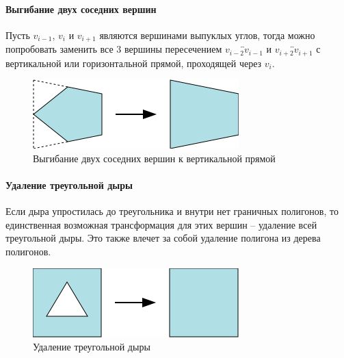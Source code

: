 \documentclass{fefu_thesis/cls/fefu}
\newcommand*\gline[1]{\overleftrightarrow{#1}}
\begin{document}
    \paragraph{Выгибание двух соседних вершин}
    Пусть $v_{i - 1}$, $v_{i}$ и $v_{i + 1}$ являются вершинами выпуклых углов, тогда можно попробовать заменить все 3 вершины пересечением $\gline{v_{i - 2}v_{i - 1}}$ и $\gline{v_{i + 2}v_{i + 1}}$ с вертикальной или горизонтальной прямой, проходящей через $v_i$.
    \begin{figure}[H]
        \centering
        \includegraphics[scale=1]{images/bendoutboth.png}
        \caption{Выгибание двух соседних вершин к вертикальной прямой}
    \end{figure}
    \paragraph{Удаление треугольной дыры}
    Если дыра упростилась до треугольника и внутри нет граничных полигонов, то единственная возможная трансформация для этих вершин -- удаление всей треугольной дыры. Это также влечет за собой удаление полигона из дерева полигонов.

    \begin{figure}[H]
        \centering
        \includegraphics[scale=1]{images/remove_triangular_hole.png}
        \caption{Удаление треугольной дыры}
    \end{figure}
\end{document}

